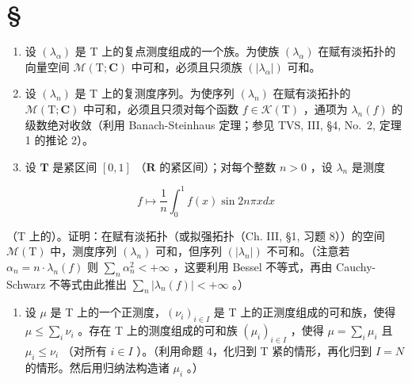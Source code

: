\section*{\texorpdfstring{\S\CurrentExerciseGroup}{第{\CurrentExerciseGroup}节}}
{}

\begin{enumerate}
\def\labelenumi{\arabic{enumi})}
\item
  设 \((\lambda_{\alpha})\) 是 T 上的复点测度组成的一个族。为使族 \((\lambda_{\alpha})\) 在赋有淡拓扑的向量空间 \(\mathcal{M}(\mathrm{T};\mathbf{C})\) 中可和，必须且只须族 \((|\lambda_{\alpha}|)\) 可和。
\item
  设 \((\lambda_{n})\) 是 T 上的复测度序列。为使序列 \((\lambda_{n})\) 在赋有淡拓扑的 \(\mathcal{M}(\mathrm{T};\mathbf{C})\) 中可和，必须且只须对每个函数 \(f\in \mathcal{K}(\mathrm{T})\) ，通项为 \(\lambda_{n}(f)\) 的级数绝对收敛（利用 Banach-Steinhaus 定理；参见 TVS, III, §4, No.~2, 定理 1 的推论 2）。
\item
  设 \(\mathbf{T}\) 是紧区间 \([0,1]\) （\(\mathbf{R}\) 的紧区间）；对每个整数 \(n > 0\) ，设 \(\lambda_{n}\) 是测度
\end{enumerate}

\[
f \mapsto \frac {1}{n} \int_ {0} ^ {1} f (x) \sin 2 n \pi x d x
\]

（T 上的）。证明：在赋有淡拓扑（或拟强拓扑（Ch. III, §1, 习题 8））的空间 \(\mathcal{M}(\mathrm{T})\) 中，测度序列 \((\lambda_n)\) 可和，但序列 \((|\lambda_n|)\) 不可和。（注意若 \(\alpha_n = n \cdot \lambda_n(f)\) 则 \(\sum_{n} \alpha_n^2 < +\infty\) ，这要利用 Bessel 不等式，再由 Cauchy-Schwarz 不等式由此推出 \(\sum_{n} |\lambda_n(f)| < +\infty\) 。）

\begin{enumerate}
\def\labelenumi{\arabic{enumi})}
\setcounter{enumi}{3}
\tightlist
\item
  设 \(\mu\) 是 T 上的一个正测度，\((\nu_{i})_{i\in I}\) 是 T 上的正测度组成的可和族，使得 \(\mu \leqslant \sum_{i}\nu_{i}\) 。存在 T 上的测度组成的可和族 \((\mu_{i})_{i\in I}\) ，使得 \(\mu = \sum_{i}\mu_{i}\) 且 \(\mu_{i} \leqslant \nu_{i}\) （对所有 \(i \in I\) ）。（利用命题 4，化归到 T 紧的情形，再化归到 \(I = N\) 的情形。然后用归纳法构造诸 \(\mu_{i}\) 。）
\end{enumerate}

\setcounter{exercisegroup}{3}
\edef\CurrentExerciseGroup{\arabic{exercisegroup}}
